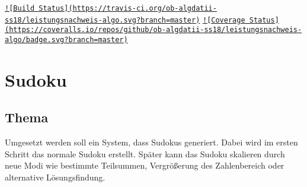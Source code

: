 \href{https://travis-ci.org/ob-algdatii-ss18/leistungsnachweis-algo}{\tt !\mbox{[}Build Status\mbox{]}(https\-://travis-\/ci.\-org/ob-\/algdatii-\/ss18/leistungsnachweis-\/algo.\-svg?branch=master)} \href{https://coveralls.io/github/ob-algdatii-ss18/leistungsnachweis-algo?branch=master}{\tt !\mbox{[}Coverage Status\mbox{]}(https\-://coveralls.\-io/repos/github/ob-\/algdatii-\/ss18/leistungsnachweis-\/algo/badge.\-svg?branch=master)}

\section*{Sudoku}

\subsection*{Thema}

Umgesetzt werden soll ein System, dass Sudokus generiert. Dabei wird im ersten Schritt das normale Sudoku erstellt. Später kann das Sudoku skalieren durch neue Modi wie bestimmte Teilsummen, Vergrößerung des Zahlenbereich oder alternative Lösungsfindung. 